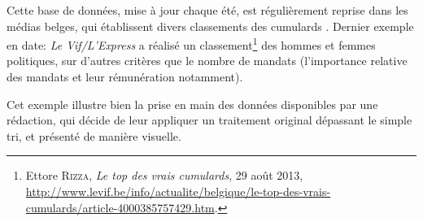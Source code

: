 Cette base de données, mise à jour chaque été, est régulièrement reprise dans les médias 
belges, qui établissent divers classements des \og cumulards \fg. Dernier exemple en 
date: \textit{Le Vif/L'Express} a réalisé un classement\footnote{Ettore \textsc{Rizza}, \textit{Le top des vrais cumulards}, 29 août 2013, \\ \url{http://www.levif.be/info/actualite/belgique/le-top-des-vrais-cumulards/article-4000385757429.htm}.} des hommes et femmes politiques,
sur d'autres critères que le nombre de mandats (l'importance relative des mandats et 
leur rémunération notamment).

Cet exemple illustre bien la prise en main des données disponibles par une rédaction, 
qui décide de leur appliquer un traitement original dépassant le simple tri, et présenté de manière visuelle.
